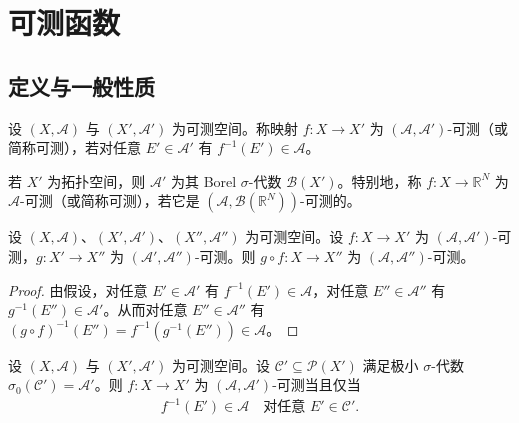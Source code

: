 \documentclass[../../main.tex]{subfiles}%
\begin{document}
\section{可测函数}\label{section:ch02-可测函数}

\subsection{定义与一般性质}\label{subsection:ch02-定义与一般性质}

\begin{definition}\label{definition:ch02-可测函数}\label{definition:ch02-可测性}
设 $(X,\mathscr A)$ 与 $(X',\mathscr A')$ 为可测空间。称映射 $f:X\to X'$ 为 $(\mathscr A,\mathscr A')$-可测（或简称可测），若对任意 $E'\in\mathscr A'$ 有 $f^{-1}(E')\in\mathscr A$。
\end{definition}

\begin{remark}\label{remark:ch02-Borel可测}
若 $X'$ 为拓扑空间，则 $\mathscr A'$ 为其 Borel $\sigma$-代数 $\mathscr B(X')$。特别地，称 $f:X\to\mathbb R^N$ 为 $\mathscr A$-可测（或简称可测），若它是 $(\mathscr A,\mathscr B(\mathbb R^N))$-可测的。
\end{remark}

\begin{proposition}\label{proposition:ch02-复合可测}
设 $(X,\mathscr A)$、$(X',\mathscr A')$、$(X'',\mathscr A'')$ 为可测空间。设 $f:X\to X'$ 为 $(\mathscr A,\mathscr A')$-可测，$g:X'\to X''$ 为 $(\mathscr A',\mathscr A'')$-可测。则 $g\circ f:X\to X''$ 为 $(\mathscr A,\mathscr A'')$-可测。
\end{proposition}

\begin{proof}
由假设，对任意 $E'\in\mathscr A'$ 有 $f^{-1}(E')\in\mathscr A$，对任意 $E''\in\mathscr A''$ 有 $g^{-1}(E'')\in\mathscr A'$。从而对任意 $E''\in\mathscr A''$ 有 $(g\circ f)^{-1}(E'')=f^{-1}(g^{-1}(E''))\in\mathscr A$。
\end{proof}

\begin{lemma}\label{lemma:ch02-生成集可测}
\label{lemma:ch02-基判定}
设 $(X,\mathscr A)$ 与 $(X',\mathscr A')$ 为可测空间。设 $\mathscr C'\subseteq\mathscr P(X')$ 满足极小 $\sigma$-代数 $\sigma_0(\mathscr C')=\mathscr A'$。则 $f:X\to X'$ 为 $(\mathscr A,\mathscr A')$-可测当且仅当
\begin{align}
f^{-1}(E')\in\mathscr A\quad\text{对任意 }E'\in\mathscr C'. \label{align:ch02-2.1}
\end{align}
\end{lemma}
\end{document}
